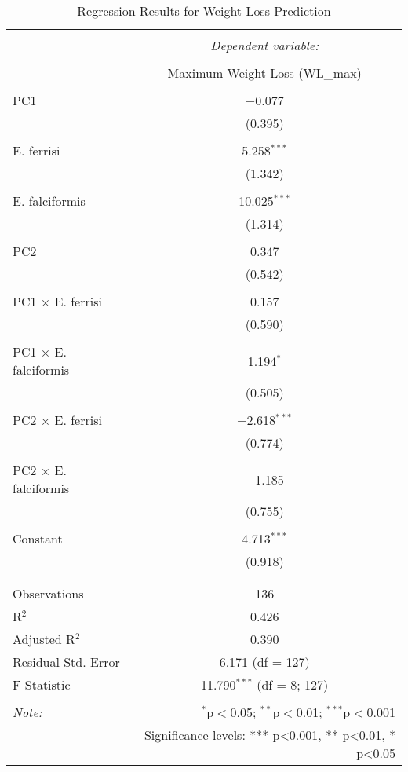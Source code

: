 
\begin{table}[!htbp] \centering 
  \caption{Regression Results for Weight Loss Prediction} 
  \label{} 
\begin{tabular}{@{\extracolsep{5pt}}lc} 
\\[-1.8ex]\hline 
\hline \\[-1.8ex] 
 & \multicolumn{1}{c}{\textit{Dependent variable:}} \\ 
\cline{2-2} 
\\[-1.8ex] & Maximum Weight Loss (WL_max) \\ 
\hline \\[-1.8ex] 
 PC1 & $-$0.077 \\ 
  & (0.395) \\ 
  & \\ 
 E. ferrisi & 5.258$^{***}$ \\ 
  & (1.342) \\ 
  & \\ 
 E. falciformis & 10.025$^{***}$ \\ 
  & (1.314) \\ 
  & \\ 
 PC2 & 0.347 \\ 
  & (0.542) \\ 
  & \\ 
 PC1 × E. ferrisi & 0.157 \\ 
  & (0.590) \\ 
  & \\ 
 PC1 × E. falciformis & 1.194$^{*}$ \\ 
  & (0.505) \\ 
  & \\ 
 PC2 × E. ferrisi & $-$2.618$^{***}$ \\ 
  & (0.774) \\ 
  & \\ 
 PC2 × E. falciformis & $-$1.185 \\ 
  & (0.755) \\ 
  & \\ 
 Constant & 4.713$^{***}$ \\ 
  & (0.918) \\ 
  & \\ 
\hline \\[-1.8ex] 
Observations & 136 \\ 
R$^{2}$ & 0.426 \\ 
Adjusted R$^{2}$ & 0.390 \\ 
Residual Std. Error & 6.171 (df = 127) \\ 
F Statistic & 11.790$^{***}$ (df = 8; 127) \\ 
\hline 
\hline \\[-1.8ex] 
\textit{Note:}  & \multicolumn{1}{r}{$^{*}$p$<$0.05; $^{**}$p$<$0.01; $^{***}$p$<$0.001} \\ 
 & \multicolumn{1}{r}{Significance levels: *** p<0.001, ** p<0.01, * p<0.05} \\ 
\end{tabular} 
\end{table} 
